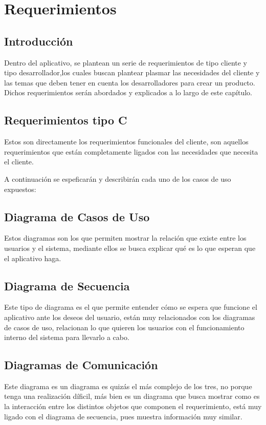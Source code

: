 \chapter{Requerimientos}
\section{Introducción}
Dentro del aplicativo, se plantean un serie de requerimientos de tipo cliente y tipo desarrollador,los cuales buscan plantear plasmar las necesidades del cliente y las temas que deben tener en cuenta los desarrolladores para crear un producto. Dichos requerimientos serán abordados y explicados a lo largo de este capítulo.
\section{Requerimientos tipo C}
Estos son directamente los requerimientos funcionales del cliente, son aquellos requerimientos que están completamente ligados con las necesidades que necesita el cliente.

A continuación se espeficarán y describirán cada uno de los casos de uso expuestos:


\section{Diagrama de Casos de Uso}
Estos diagramas son los que permiten mostrar la relación que existe entre los usuarios y el sistema, mediante ellos se busca explicar qué es lo que esperan que el aplicativo haga.

\section{Diagrama de Secuencia}
Este tipo de diagrama es el que permite entender cómo se espera que funcione el aplicativo ante los deseos del usuario, están muy relacionados con los diagramas de casos de uso, relacionan lo que quieren los usuarios con el funcionamiento interno del sistema para llevarlo a cabo.

\section{Diagramas de Comunicación}
Este diagrama es un diagrama es quizás el más complejo de los tres, no porque tenga una realización díficil, más bien es un diagrama que busca mostrar como es la interacción entre los distintos objetos que componen el requerimiento, está muy ligado con el diagrama de secuencia, pues muestra información muy similar.


